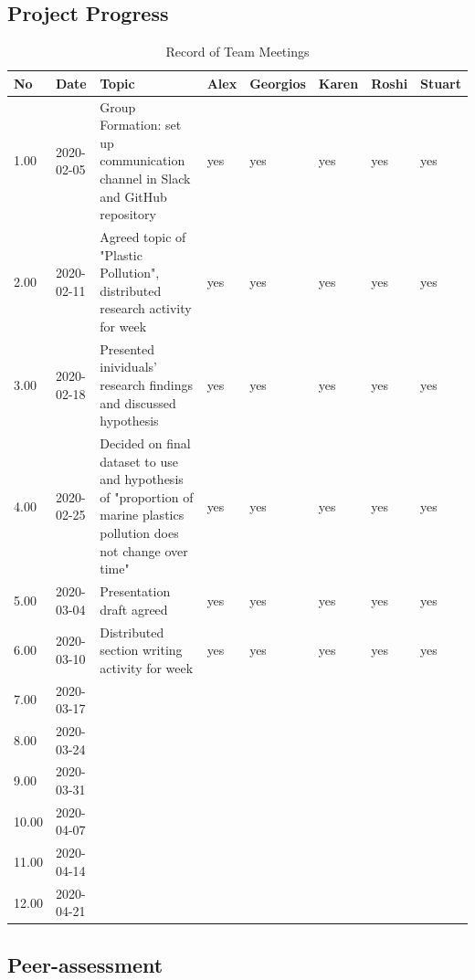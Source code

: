 \documentclass[10pt]{article}\usepackage[]{graphicx}\usepackage[]{color}
\begin{document}
\subsection{Project Progress}

\begin{table}[ht]
\centering
\caption{Record of Team Meetings} 
\label{tab:one}
\begin{tabular}{llp{8cm}lllll}
  \hline
No & Date & Topic & Alex & Georgios & Karen & Roshi & Stuart \\ 
  \hline
1.00 & 2020-02-05 & Group Formation: set up communication channel in Slack and GitHub repository & yes & yes & yes & yes & yes \\ 
  2.00 & 2020-02-11 & Agreed topic of "Plastic Pollution", distributed research activity for week & yes & yes & yes & yes & yes \\ 
  3.00 & 2020-02-18 & Presented inividuals' research findings and discussed hypothesis & yes & yes & yes & yes & yes \\ 
  4.00 & 2020-02-25 & Decided on final dataset to use and hypothesis of "proportion of marine plastics pollution does not change over time" & yes & yes & yes & yes & yes \\ 
  5.00 & 2020-03-04 & Presentation draft agreed & yes & yes & yes & yes & yes \\ 
  6.00 & 2020-03-10 & Distributed section writing activity for week & yes & yes & yes & yes & yes \\ 
  7.00 & 2020-03-17 &  &  &  &  &  &  \\ 
  8.00 & 2020-03-24 &  &  &  &  &  &  \\ 
  9.00 & 2020-03-31 &  &  &  &  &  &  \\ 
  10.00 & 2020-04-07 &  &  &  &  &  &  \\ 
  11.00 & 2020-04-14 &  &  &  &  &  &  \\ 
  12.00 & 2020-04-21 &  &  &  &  &  &  \\ 
   \hline
\end{tabular}
\end{table}





\subsection{Peer-assessment}
\end{document}

